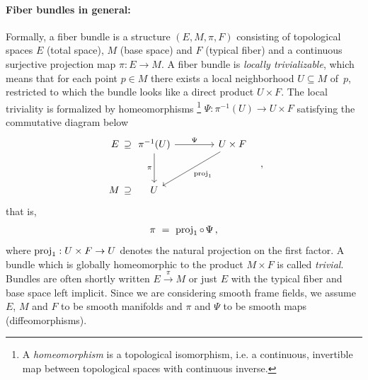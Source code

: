 \paragraph{Fiber bundles in general:}
Formally, a fiber bundle is a structure $(E,M,\pi,F)$ consisting of topological spaces $E$ (total space), $M$ (base space) and $F$ (typical fiber) and a continuous surjective projection map $\pi:E\to M$.
A fiber bundle is \emph{locally trivializable}, which means that for each point $p\in M$ there exists a local neighborhood $U\subseteq M$ of~$p$, restricted to which the bundle looks like a direct product $U\times F$.
The local triviality is formalized by homeomorphisms%
\footnote{
    A \emph{homeomorphism} is a topological isomorphism, i.e. a continuous, invertible map between topological spaces with continuous inverse.
}
$\Psi:\pi^{-1}(U)\to U\times F$ satisfying the commutative diagram below
\\[-2ex]
\begin{equation}\label{cd:trivialization_general_intro}
\begin{tikzcd}[row sep=3em, column sep=4em]
    \:E\: \supseteq
    &[-4.2em]
    \pi^{-1}(U) \arrow[d, swap, "\pi"] \arrow[r, "\Psi"]
    & U\times F \arrow[ld, "\proj_1"] \\
    M\, \supseteq
    & U
\end{tikzcd}
\quad ,
\end{equation}
that is,
\begin{align}\label{eq:local_triviality_proj}
   \pi\ =\  \operatorname{proj}_1 \circ \mkern2mu \Psi \,,
\end{align}
where $\operatorname{proj}_1: U\times F\to U$ denotes the natural projection on the first factor.
A bundle which is globally homeomorphic to the product $M\times F$ is called \emph{trivial}.
Bundles are often shortly written $E\!\xrightarrow{\pi}\!M$ or just $E$ with the typical fiber and base space left implicit.
Since we are considering smooth frame fields, we assume $E$, $M$ and $F$ to be smooth manifolds and $\pi$ and $\Psi$ to be smooth maps (diffeomorphisms).


